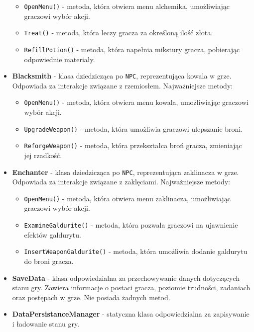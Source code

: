 \begin{itemize}
\begin{itemize}
                        \item \texttt{OpenMenu()} - metoda, która otwiera menu alchemika, umożliwiając graczowi wybór akcji.
                        \item \texttt{Treat()} - metoda, która leczy gracza za określoną ilość złota.
                        \item \texttt{RefillPotion()} - metoda, która napełnia mikstury gracza, pobierając odpowiednie materiały.
                    \end{itemize}
                \item \textbf{Blacksmith} - klasa dziedzicząca po \texttt{NPC}, reprezentująca kowala w grze. Odpowiada za interakcje związane z rzemiosłem. Najważniejsze metody:
                    \begin{itemize}
                        \item \texttt{OpenMenu()} - metoda, która otwiera menu kowala, umożliwiając graczowi wybór akcji.
                        \item \texttt{UpgradeWeapon()} - metoda, która umożliwia graczowi ulepszanie broni.
                        \item \texttt{ReforgeWeapon()} - metoda, która przekształca broń gracza, zmieniając jej rzadkość.
                    \end{itemize}
                \item \textbf{Enchanter} - klasa dziedzicząca po \texttt{NPC}, reprezentująca zaklinacza w grze. Odpowiada za interakcje związane z zaklęciami. Najważniejsze metody:
                    \begin{itemize}
                        \item \texttt{OpenMenu()} - metoda, która otwiera menu zaklinacza, umożliwiając graczowi wybór akcji.
                        \item \texttt{ExamineGaldurite()} - metoda, która pozwala graczowi na ujawnienie efektów galdurytu.
                        \item \texttt{InsertWeaponGaldurite()} - metoda, która umożliwia dodanie galdurytu do broni gracza.
                    \end{itemize}
                \item \textbf{SaveData} - klasa odpowiedzialna za przechowywanie danych dotyczących stanu gry. 
                Zawiera informacje o postaci gracza, poziomie trudności, zadaniach oraz postępach w grze. Nie posiada żadnych metod.
                \item \textbf{DataPersistanceManager} - statyczna klasa odpowiedzialna za zapisywanie i ładowanie stanu gry. 

\end{itemize}
